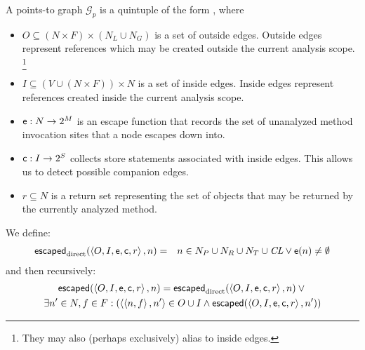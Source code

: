 \documentclass[11pt,notitlepage]{article}
\newcommand{\bigvar}[1]{\ensuremath{\text{\it #1}}}
\newcommand{\func}[1]{\ensuremath{\text{\sffamily #1}}}
\begin{document}
A points-to graph $\mathcal{G}_p$ is a quintuple of the form \tuple{O,I,\func{e},\func{c},r}, where
\begin{itemize}
\item $O \subseteq (N\times F)\times(N_L \cup N_G)$ is a set of
outside edges.  Outside edges represent references which may be
created outside the current analysis scope.%
\footnote{They may also (perhaps exclusively) alias to inside edges.}
\item $I \subseteq (V\cup(N\times F))\times N$ is a set of inside
edges.  Inside edges represent references created inside the current
analysis scope.
\item $\func{e}:N\to 2^M$ is an escape function that records the set of
unanalyzed method invocation sites that a node escapes down into.
\item $\func{c}:I\to 2^S$ collects store statements associated with
inside edges.  This allows us to detect possible companion edges.
\item $r \subseteq N$ is a return set representing the set of objects
that may be returned by the currently analyzed method.
\end{itemize}
We define:
\begin{eqnarray*}
\func{escaped}_\text{direct}(\tuple{O,I,\func{e},\func{c},r}, n) &=&
 n\in N_P \cup N_R \cup N_T \cup \bigvar{CL}
 \vee
 \func{e}(n)\neq\emptyset
\end{eqnarray*}
and then recursively:
\begin{multline*}
\func{escaped}%
              (\tuple{O,I,\func{e},\func{c},r},n) =
 \func{escaped}_\text{direct}(\tuple{O,I,\func{e},\func{c},r},n) \vee {}
\\
 \exists n'\in N,f\in F : \left(\tuple{\tuple{n,f},n'}\in O\cup I
 \wedge
 \func{escaped}%
               (\tuple{O,I,\func{e},\func{c},r},n')\right)
\end{multline*}
\end{document}
